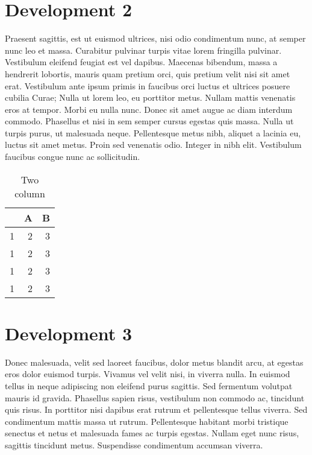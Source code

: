 \documentclass{genos-technical-report}
\begin{document}
\section{Development 2}
\label{sec:development-2}


Praesent sagittis, est ut euismod ultrices, nisi odio condimentum
nunc, at semper nunc leo et massa. Curabitur pulvinar turpis vitae
lorem fringilla pulvinar. Vestibulum eleifend feugiat est vel
dapibus. Maecenas bibendum, massa a hendrerit lobortis, mauris quam
pretium orci, quis pretium velit nisi sit amet erat. Vestibulum ante
ipsum primis in faucibus orci luctus et ultrices posuere cubilia
Curae; Nulla ut lorem leo, eu porttitor metus. Nullam mattis venenatis
eros at tempor. Morbi eu nulla nunc. Donec sit amet augue ac diam
interdum commodo. Phasellus et nisi in sem semper cursus egestas quis
massa. Nulla ut turpis purus, ut malesuada neque. Pellentesque metus
nibh, aliquet a lacinia eu, luctus sit amet metus. Proin sed venenatis
odio. Integer in nibh elit. Vestibulum faucibus congue nunc ac
sollicitudin.

\begin{table}
  \centering
  \begin{tabular}{l|rr}
    & A & B \\
    \hline
    1 & 2 & 3 \\
    1 & 2 & 3 \\
    1 & 2 & 3 \\
    1 & 2 & 3
  \end{tabular}
  \caption{Two column}
  \label{tab:two}
\end{table}

\section{Development 3}
\label{sec:development-3}

Donec malesuada, velit sed laoreet faucibus, dolor metus blandit arcu,
at egestas eros dolor euismod turpis. Vivamus vel velit nisi, in
viverra nulla. In euismod tellus in neque adipiscing non eleifend
purus sagittis. Sed fermentum volutpat mauris id gravida. Phasellus
sapien risus, vestibulum non commodo ac, tincidunt quis risus. In
porttitor nisi dapibus erat rutrum et pellentesque tellus viverra. Sed
condimentum mattis massa ut rutrum. Pellentesque habitant morbi
tristique senectus et netus et malesuada fames ac turpis
egestas. Nullam eget nunc risus, sagittis tincidunt metus. Suspendisse
condimentum accumsan viverra.
\end{document}
